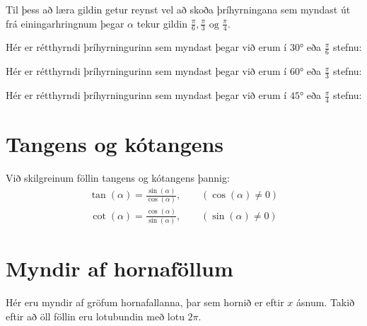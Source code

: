 \documentclass[a4paper,10pt,icelandic]{sphinxmanual}
\begin{document}
Til þess að læra gildin getur reynst vel að skoða þríhyrningana sem myndast út frá einingarhringnum þegar \(\alpha\) tekur gildin \(\frac{\pi}{6}, \frac{\pi}{3} \text{ og } \frac{\pi}{4}\).

Hér er rétthyrndi þríhyrningurinn sem myndast þegar við erum í \(30°\) eða \(\frac{\pi}{6}\) stefnu:


Hér er rétthyrndi þríhyrningurinn sem myndast þegar við erum í \(60°\) eða \(\frac{\pi}{3}\) stefnu:


Hér er rétthyrndi þríhyrningurinn sem myndast þegar við erum í \(45°\) eða \(\frac{\pi}{4}\) stefnu:



\section{Tangens og kótangens}
\label{\detokenize{Kafli07:tangens-og-kotangens}}
Við skilgreinum föllin tangens og kótangens þannig:
\begin{equation*}
\begin{split}\tan(\alpha)=\frac{\sin(\alpha)}{\cos(\alpha)}, \qquad (\cos(\alpha)\neq 0 )\end{split}
\end{equation*}\begin{equation*}
\begin{split}\cot(\alpha)=\frac{\cos(\alpha)}{\sin(\alpha)}, \qquad (\sin(\alpha)\neq 0)\end{split}
\end{equation*}

\section{Myndir af hornaföllum}
\label{\detokenize{Kafli07:myndir-af-hornafollum}}
Hér eru myndir af gröfum hornafallanna, þar sem hornið er eftir \(x\) \sphinxhyphen{} ásnum.
Takið eftir að öll föllin eru lotubundin með lotu \(2\pi\).
\end{document}
